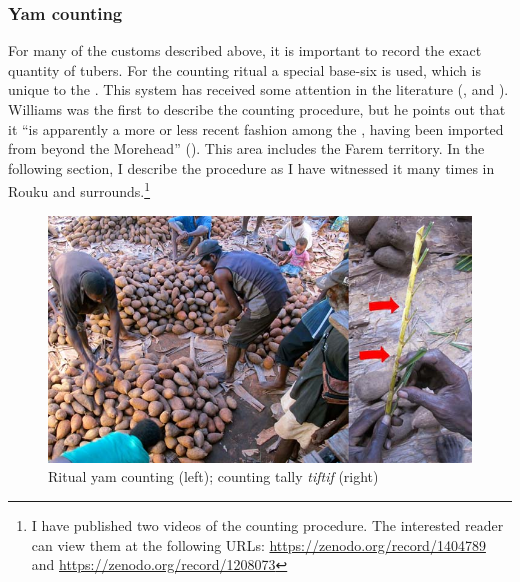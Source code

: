 \subsubsection{Yam counting}\label{yamcounting}

For many of the customs described above, it is important to record the exact quantity of tubers. For the counting ritual a special base-six  is used, which is unique to the . This  system has received some attention in the literature (\citealt{Donohue:2008bn}, \citealt{Hammarstrom:2009bp} and \citealt{Evans:2009wg}). Williams was the first to describe the counting procedure, but he points out that it ``is apparently a more or less recent fashion among the , having been imported from beyond the Morehead'' (\citeyear[225]{Williams:1936transfly}). This area includes the Farem territory. In the following section, I describe the procedure as I have witnessed it many times in Rouku and surrounds.\footnote{I have published two videos of the counting procedure. The interested reader can view them at the following URLs:  {\url{https://zenodo.org/record/1404789}} and {\url{https://zenodo.org/record/1208073}}}

\begin{figure}
  
    \includegraphics[width=.9\textwidth]{figures/yam3.jpg}
  \caption[Ritual yam counting]{Ritual yam counting (left); counting tally \emph{tiftif} (right)}
  \label{fig:yam3.jpg}
\end{figure}

